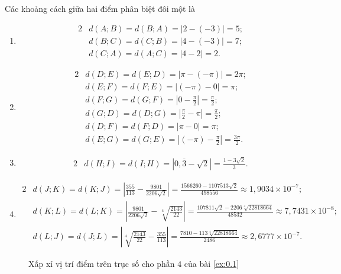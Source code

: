 Các khoảng cách giữa hai điểm phân biệt đôi một là
\begin{enumerate}
   \item \begin{alignat*}{2}
      &d(A;B) = d(B;A) = \left|2 - (-3)\right| = \boxed{5}; \\
      &d(B;C) = d(C;B) = \left|4 - (-3)\right| = \boxed{7}; \\
      &d(C;A) = d(A;C) = \left|4 - 2\right| = \boxed{2}.
   \end{alignat*}
   \item \begin{alignat*}{2}
      &d(D;E) = d(E;D) = \left|\pi - (-\pi)\right| = \boxed{2\pi}; \\
      &d(E;F) = d(F;E) = \left|(-\pi) - 0\right| = \boxed{\pi}; \\
      &d(F;G) = d(G;F) = \left|0 - \frac{\pi}{2}\right| = \boxed{\frac{\pi}{2}}; \\
      &d(G;D) = d(D;G) = \left|\frac{\pi}{2} - \pi\right| = \boxed{\frac{\pi}{2}}; \\
      &d(D;F) = d(F;D) = \left|\pi - 0\right| = \boxed{\pi};\\
      &d(E;G) = d(G;E) = \left|(-\pi) - \frac{\pi}{2}\right| = \boxed{\frac{3\pi}{2}}.
   \end{alignat*}
   \item \begin{alignat*}{2}
      &d(H;I) = d(I;H) = \left|0{,}\overline{3} - \sqrt{2}\right| = \boxed{\frac{1-3\sqrt{2}}{3}}.
   \end{alignat*}
   \item \begin{alignat*}{2}
      &d(J;K) = d(K;J) = \left|\frac{355}{113} - \frac{9801}{2206\sqrt{2}}\right| = \boxed{\frac{1566260-1107513\sqrt{2}}{498556} \approx 1{,}9034\times 10^{-7}}; \\
      &d(K;L) = d(L;K) = \left|\frac{9801}{2206\sqrt{2}} - \sqrt[4]{\frac{2143}{22}}\right| = \boxed{\frac{107811\sqrt{2}-2206\sqrt[4]{22818664}}{48532} \approx 7{,}7431\times 10^{-8}}; \\
      &d(L;J) = d(J;L) = \left|\sqrt[4]{\frac{2143}{22}} - \frac{355}{113}\right| = \boxed{\frac{7810-113\sqrt[4]{22818664}}{2486} \approx 2{,}6777\times 10^{-7}}.
   \end{alignat*}
\end{enumerate}

\begin{figure}[h]
   \centering
   \caption{Xấp xỉ vị trí điểm trên trục số cho phần $4$ của bài \ref{ex:0.1}}
   \label{fig:do_thi:truc_so:truc_so_bon_xx}
\end{figure}

